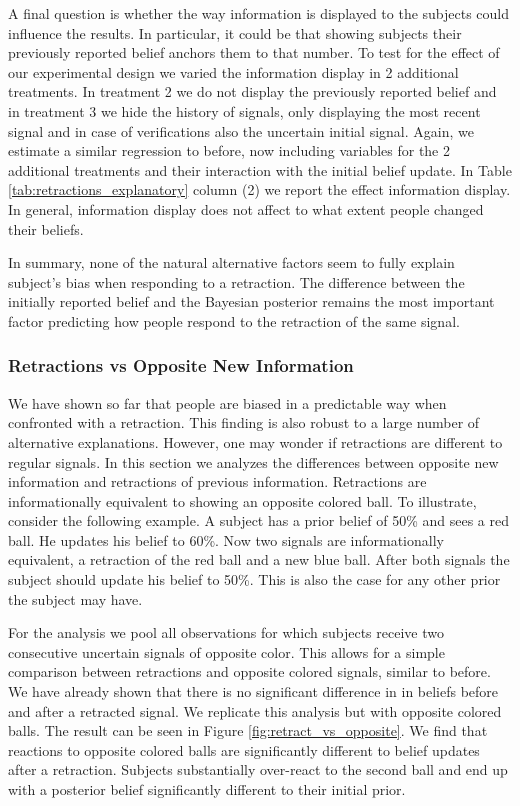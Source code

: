 \documentclass{article}
\begin{document}
A final question is whether the way information is displayed to the subjects could influence the results. In particular, it could be that showing subjects their previously reported belief anchors them to that number. To test for the effect of our experimental design we varied the information display in  2 additional treatments. In treatment 2 we do not display the previously reported belief and in treatment 3 we hide the history of signals, only displaying the most recent signal and in case of verifications also the uncertain initial signal. Again, we estimate a similar regression to before, now including variables for the 2 additional treatments and their interaction with the initial belief update. In Table \ref{tab:retractions_explanatory} column (2) we report the effect information display. In general, information display does not affect to what extent people changed their beliefs. 

In summary, none of the natural alternative factors seem to fully explain subject's bias when responding to a retraction. The difference between the initially reported belief and the Bayesian posterior remains the most important factor predicting how people respond to the retraction of the same signal.


\subsubsection{Retractions vs Opposite New Information}

We have shown so far that people are biased in a predictable way when confronted with a retraction. This finding is also robust to a large number of alternative explanations. However, one may wonder if retractions are different to regular signals. In this section we analyzes the differences between opposite new information and retractions of previous information. Retractions are informationally equivalent to showing an opposite colored ball. To illustrate, consider the following example. A subject has a prior belief of 50\% and sees a red ball. He updates his belief to 60\%. Now two signals are informationally equivalent, a retraction of the red ball and a new blue ball. After both signals the subject should update his belief to 50\%. This is also the case for any other prior the subject may have. 

For the analysis we pool all observations for which subjects receive two consecutive uncertain signals of opposite color. This allows for a simple comparison between retractions and opposite colored signals, similar to before. We have already shown that there is no significant difference in in beliefs before and after a retracted signal. We replicate this analysis but with opposite colored balls. The result can be seen in Figure \ref{fig:retract_vs_opposite}. We find that reactions to opposite colored balls are significantly different to belief updates after a retraction. Subjects substantially over-react to the second ball and end up with a posterior belief significantly different to their initial prior.
\end{document}
